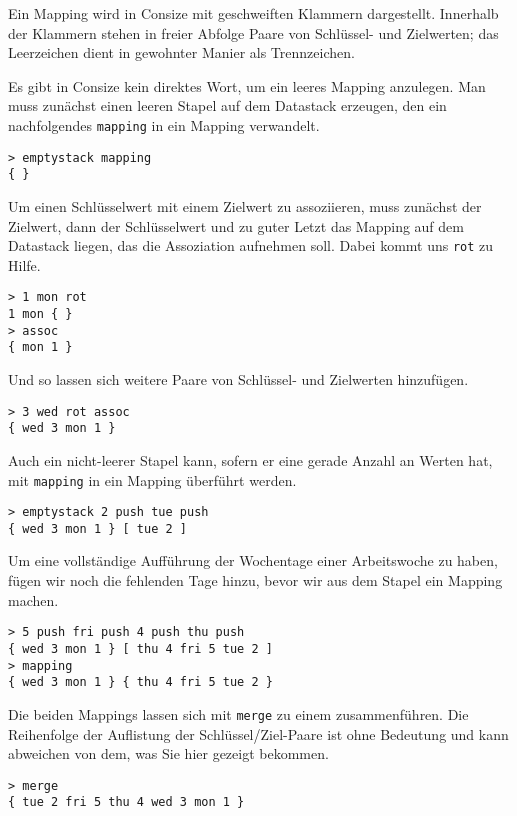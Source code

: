 Ein Mapping wird in Consize mit geschweiften Klammern dargestellt. Innerhalb der Klammern stehen in freier Abfolge Paare von Schlüssel- und Zielwerten; das Leerzeichen dient in gewohnter Manier als Trennzeichen.

Es gibt in Consize kein direktes Wort, um ein leeres Mapping anzulegen. Man muss zunächst einen leeren Stapel auf dem Datastack erzeugen, den ein nachfolgendes \verb|mapping| in ein Mapping verwandelt.

\begin{verbatim}
> emptystack mapping
{ }
\end{verbatim}

Um einen Schlüsselwert mit einem Zielwert zu assoziieren, muss zunächst der Zielwert, dann der Schlüsselwert und zu guter Letzt das Mapping auf dem Datastack liegen, das die Assoziation aufnehmen soll. Dabei kommt uns \verb|rot| zu Hilfe.

\begin{verbatim}
> 1 mon rot
1 mon { }
> assoc
{ mon 1 }
\end{verbatim}

Und so lassen sich weitere Paare von Schlüssel- und Zielwerten hinzufügen.

\begin{verbatim}
> 3 wed rot assoc
{ wed 3 mon 1 }
\end{verbatim} 

Auch ein nicht-leerer Stapel kann, sofern er eine gerade Anzahl an Werten hat, mit \verb|mapping| in ein Mapping überführt werden.

\begin{verbatim}
> emptystack 2 push tue push
{ wed 3 mon 1 } [ tue 2 ]
\end{verbatim}

Um eine vollständige Aufführung der Wochentage einer Arbeitswoche zu haben, fügen wir noch die fehlenden Tage hinzu, bevor wir aus dem Stapel ein Mapping machen.

\begin{verbatim}
> 5 push fri push 4 push thu push
{ wed 3 mon 1 } [ thu 4 fri 5 tue 2 ]
> mapping
{ wed 3 mon 1 } { thu 4 fri 5 tue 2 }
\end{verbatim}

Die beiden Mappings lassen sich mit \verb|merge| zu einem zusammenführen. Die Reihenfolge der Auflistung der Schlüssel\slash Ziel-Paare ist ohne Bedeutung und kann abweichen von dem, was Sie hier gezeigt bekommen.

\begin{verbatim}
> merge
{ tue 2 fri 5 thu 4 wed 3 mon 1 }
\end{verbatim}

